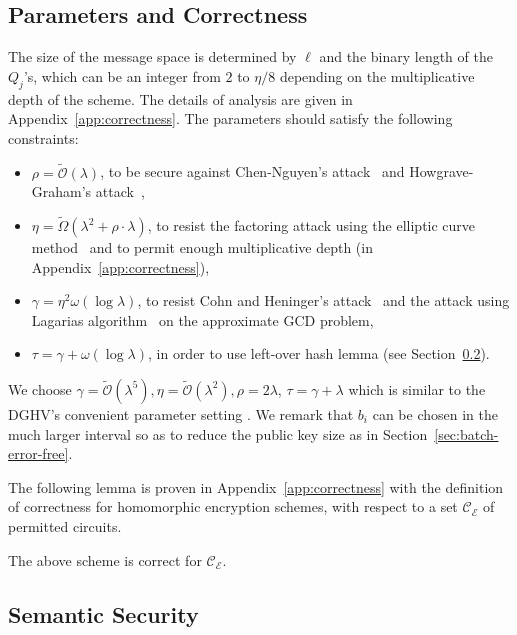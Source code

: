 \documentclass{llncs}
\begin{document}
\subsection{Parameters and Correctness}\label{parameter}
The size of the message space is determined by $\ell$ and the binary
length of the $Q_j$'s, which can be an integer from $2$ to $\eta/8$
depending on the multiplicative depth of the scheme. The details of
analysis are given in Appendix~\ref{app:correctness}. 
The parameters should satisfy the following constraints:  
\begin{itemize}
\renewcommand{\labelitemi}{\tiny $\bullet$}
\itemsep.4em
\item $\rho=\tilde{\mathcal{O}}(\lambda)$, to be secure against Chen-Nguyen's attack~\cite{CN2012} and Howgrave-Graham's attack~\cite{How2001},
\item $\eta=\tilde{\Omega}(\lambda^2 +\rho\cdot \lambda)$, to resist the factoring attack using the elliptic curve method~\cite{Len1987} and to permit enough multiplicative depth (in Appendix~\ref{app:correctness}),
\item $\gamma=\eta^2\omega(\log \lambda)$, to resist Cohn and Heninger's attack~\cite{CH2011} and the attack using Lagarias algorithm~\cite{Lag1985} on the approximate GCD problem,
\item $\tau=\gamma+\omega(\log\lambda)$, in order to use left-over
  hash lemma (see Section~\ref{reduce_acd}).
\end{itemize}
We choose $\gamma=\tilde{\mathcal{O}}(\lambda^5), \eta=\tilde{\mathcal{O}}(\lambda^2),
\rho=2\lambda$, $\tau=\gamma+\lambda$ which is similar to the DGHV's convenient parameter setting \cite{vDGHV2010}. We remark that $b_i$ can be chosen in the much larger interval so as to reduce the public key size as in Section~\ref{sec:batch-error-free}. 

The following lemma is proven in Appendix~\ref{app:correctness} with the definition of correctness for
homomorphic encryption schemes, with respect to a set
$\mathcal{C_E}$ of permitted circuits.

\begin{lemma}\label{lem:correctness}
The above scheme is correct for $\mathcal{C_E}$.
\end{lemma}

\subsection{Semantic Security}\label{reduce_acd}
\end{document}
